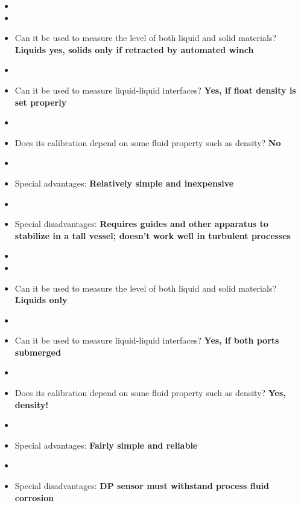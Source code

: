 \begin{itemize}
\goodbreak
\item{} 
\item\item{} Can it be used to measure the level of both liquid and solid materials? {\bf Liquids yes, solids only if retracted by automated winch}
\item\item{} Can it be used to measure liquid-liquid interfaces? {\bf Yes, if float density is set properly}
\item\item{} Does its calibration depend on some fluid property such as density? {\bf No}
\item\item{} Special advantages: {\bf Relatively simple and inexpensive}
\item\item{} Special disadvantages: {\bf Requires guides and other apparatus to stabilize in a tall vessel; doesn't work well in turbulent processes}
\end{itemize}

\vskip 10pt

\begin{itemize}
\goodbreak
\item{} 
\item\item{} Can it be used to measure the level of both liquid and solid materials? {\bf Liquids only}
\item\item{} Can it be used to measure liquid-liquid interfaces? {\bf Yes, if both ports submerged}
\item\item{} Does its calibration depend on some fluid property such as density? {\bf Yes, density!}
\item\item{} Special advantages: {\bf Fairly simple and reliable}
\item\item{} Special disadvantages: {\bf DP sensor must withstand process fluid corrosion}
\end{itemize}

\vskip 10pt

